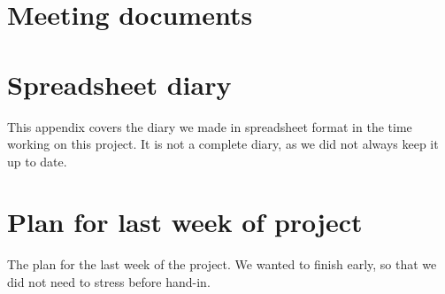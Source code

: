 \section{Meeting documents}
\label{APP-WS-MD}



\section{Spreadsheet diary}
\label{APP-SS}
This appendix covers the diary we made in spreadsheet format in the time working
on this project. It is not a complete diary, as we did not always keep it up to
date. 



\section{Plan for last week of project}
\label{APP-LW}
The plan for the last week of the project. We wanted to finish early, so that we
did not need to stress before hand-in.

